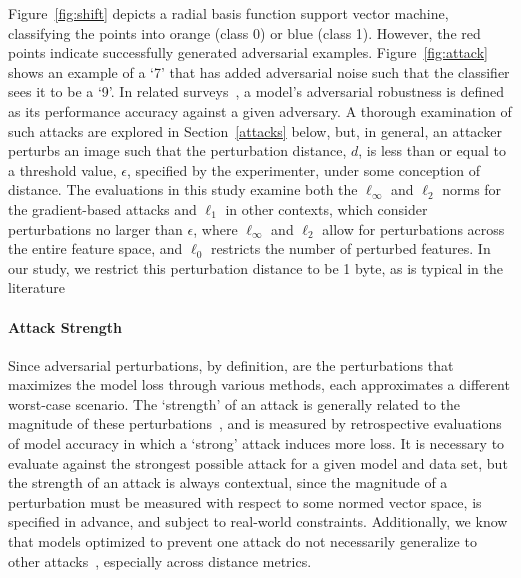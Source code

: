 \documentclass[lettersize,journal]{IEEEtran}
\begin{document}
Figure~\ref{fig:shift} depicts a radial basis function support vector machine, classifying the points into orange (class 0) or blue (class 1). However, the red points indicate successfully generated adversarial examples. Figure~\ref{fig:attack} shows an example of a `7' that has added adversarial noise such that the classifier sees it to be a `9'. 
In related surveys~\cite{dohmatob_generalized_2019, biggio_evasion_2013-1, bect_bayesian_2017, chakraborty_adversarial_2018, carlini_towards_2017, croce_reliable_2020}, a model's adversarial robustness is defined as its performance accuracy against a given adversary. A thorough examination of such attacks are explored in Section~\ref{attacks} below, but, in general, an attacker perturbs an image such that the perturbation distance, $d$, is less than or equal to a threshold value, $\epsilon$, specified by the experimenter, under some conception of distance. The evaluations in this study examine both the $\ell_{\infty}$ and $\ell_2$ norms for the gradient-based attacks and $\ell_1$ in other contexts, which consider perturbations no larger than $\epsilon$, where $\ell_{\infty}$ and $\ell_2$ allow for perturbations across the entire feature space, and $\ell_0$ restricts the number of perturbed features. In our study, we restrict this perturbation distance to be 1 byte, as is typical in the literature \cite{madry2017towards, miller_adversarial_2020, biggio_evasion_2013, biggio_multiple_2009}

\paragraph{Attack Strength}
 Since adversarial perturbations, by definition, are the perturbations that maximizes the model loss through various methods, each approximates a different worst-case scenario. The `strength' of an attack is generally related to the magnitude of these perturbations~\cite{carlini_towards_2017}, and is measured by retrospective evaluations of model accuracy in which a `strong' attack induces more loss. It is necessary to evaluate against the strongest possible attack for a given model and data set, but the strength of an attack is always contextual, since the magnitude of a perturbation must be measured with respect to some normed vector space, is specified in advance, and subject to real-world constraints. Additionally, we know that models optimized to prevent one attack do not necessarily generalize to other attacks~\cite{carlini_towards_2017}, especially across distance metrics. 
\end{document}
